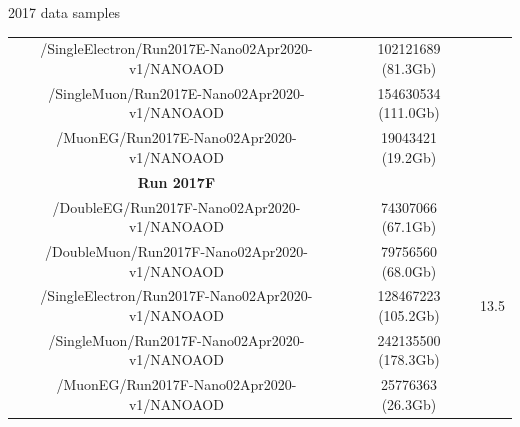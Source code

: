 \documentclass[8pt]{beamer}
\begin{document}
\begin{frame}{2017 data samples}
\begin{table}
\begin{center}
{\begin{tabular}{ c|c|c }
/SingleElectron/Run2017E-Nano02Apr2020-v1/NANOAOD & 102121689 (81.3Gb) & \\
/SingleMuon/Run2017E-Nano02Apr2020-v1/NANOAOD & 154630534 (111.0Gb) & \\
/MuonEG/Run2017E-Nano02Apr2020-v1/NANOAOD & 19043421 (19.2Gb) & \\
 \hline
\textbf{Run 2017F} & & \\ 
/DoubleEG/Run2017F-Nano02Apr2020-v1/NANOAOD & 74307066 (67.1Gb) & \multirow{ 5}{*}{13.5} \\
/DoubleMuon/Run2017F-Nano02Apr2020-v1/NANOAOD & 79756560 (68.0Gb) & \\
/SingleElectron/Run2017F-Nano02Apr2020-v1/NANOAOD & 128467223 (105.2Gb) & \\
/SingleMuon/Run2017F-Nano02Apr2020-v1/NANOAOD & 242135500 (178.3Gb) \\
 /MuonEG/Run2017F-Nano02Apr2020-v1/NANOAOD & 25776363 (26.3Gb) & \\
 \hline
\end{tabular}
}
\end{center}
\end{table}
\end{frame}
\end{document}
